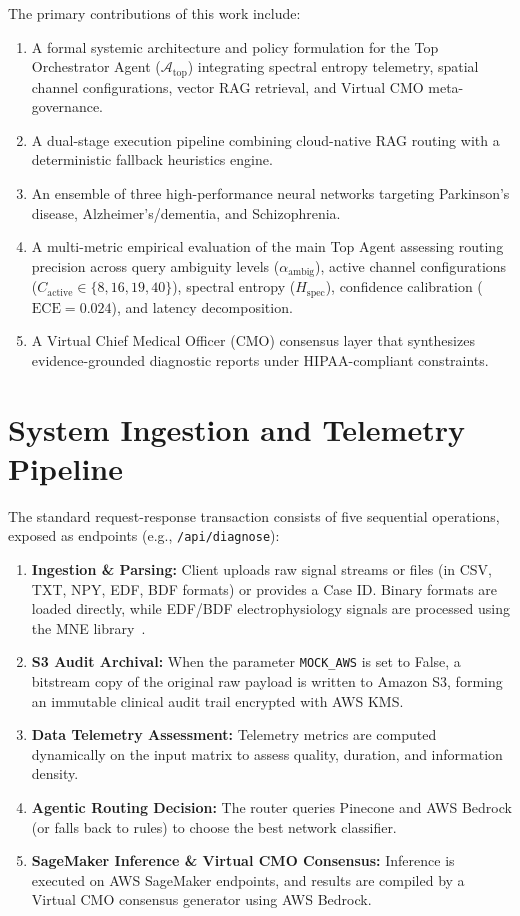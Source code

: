 \documentclass[runningheads]{llncs}
\begin{document}
The primary contributions of this work include:
\begin{enumerate}
    \item A formal systemic architecture and policy formulation for the Top Orchestrator Agent ($\mathcal{A}_{\text{top}}$) integrating spectral entropy telemetry, spatial channel configurations, vector RAG retrieval, and Virtual CMO meta-governance.
    \item A dual-stage execution pipeline combining cloud-native RAG routing with a deterministic fallback heuristics engine.
    \item An ensemble of three high-performance neural networks targeting Parkinson's disease, Alzheimer's/dementia, and Schizophrenia.
    \item A multi-metric empirical evaluation of the main Top Agent assessing routing precision across query ambiguity levels ($\alpha_{\text{ambig}}$), active channel configurations ($C_{\text{active}} \in \{8, 16, 19, 40\}$), spectral entropy ($H_{\text{spec}}$), confidence calibration ($\text{ECE} = 0.024$), and latency decomposition.
    \item A Virtual Chief Medical Officer (CMO) consensus layer that synthesizes evidence-grounded diagnostic reports under HIPAA-compliant constraints.
\end{enumerate}

\section{System Ingestion and Telemetry Pipeline}
The standard request-response transaction consists of five sequential operations, exposed as endpoints (e.g., \texttt{/api/diagnose}):
\begin{enumerate}
    \item \textbf{Ingestion \& Parsing:} Client uploads raw signal streams or files (in CSV, TXT, NPY, EDF, BDF formats) or provides a Case ID. Binary formats are loaded directly, while EDF/BDF electrophysiology signals are processed using the MNE library~\cite{mne}.
    \item \textbf{S3 Audit Archival:} When the parameter \texttt{MOCK\_AWS} is set to False, a bitstream copy of the original raw payload is written to Amazon S3, forming an immutable clinical audit trail encrypted with AWS KMS.
    \item \textbf{Data Telemetry Assessment:} Telemetry metrics are computed dynamically on the input matrix to assess quality, duration, and information density.
    \item \textbf{Agentic Routing Decision:} The router queries Pinecone and AWS Bedrock (or falls back to rules) to choose the best network classifier.
    \item \textbf{SageMaker Inference \& Virtual CMO Consensus:} Inference is executed on AWS SageMaker endpoints, and results are compiled by a Virtual CMO consensus generator using AWS Bedrock.
\end{enumerate}
\end{document}

